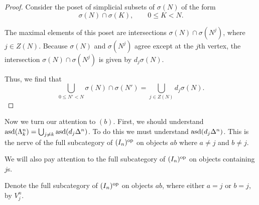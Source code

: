 \documentclass[main.tex]{subfiles}
\begin{document}
\begin{proof}
  Consider the poset of simplicial subsets of $\sigma(N)$ of the form
  \begin{equation*}
    \sigma(N) \cap \sigma(K), \qquad 0 \leq K < N.
  \end{equation*}

  The maximal elements of this poset are intersections $ \sigma(N) \cap \sigma(N^{j})$, where $j \in Z(N)$. Because $\sigma(N)$ and $\sigma(N^{j})$ agree except at the $j$th vertex, the intersection $\sigma(N) \cap \sigma(N^{j})$ is given by $d_{j} \sigma(N)$.

  Thus, we find that
  \begin{equation*}
    \bigcup_{0 \leq N' < N} \sigma(N) \cap \sigma(N') = \bigcup_{j \in Z(N)} d_{j} \sigma(N).
  \end{equation*}
\end{proof}

Now we turn our attention to $(b)$. First, we should understand $\mathrm{asd}(\Lambda^{n}_{k}) = \bigcup_{j \neq k} \mathrm{asd}(d_{j} \Delta^{n})$. To do this we must understand $\mathrm{asd}(d_{j} \Delta^{n})$. This is the nerve of the full subcategory of $(I_{n})^{\mathrm{op}}$ on objects $ab$ where $a \neq j$ and $b \neq j$.

We will also pay attention to the full subcategory of $(I_{n})^{\mathrm{op}}$ on objects containing $j$s.

\begin{definition}
  Denote the full subcategory of $(I_{n})^{\mathrm{op}}$ on objects $ab$, where either $a = j$ or $b = j$, by $V^{n}_{j}$.
\end{definition}
\end{document}
